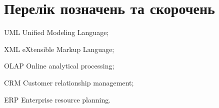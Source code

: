 \section*{Перелік позначень та скорочень}

\begin{abbrDescription}
\item[UML] Unified Modeling Language;
\item[XML] eXtensible Markup Language;
\item[OLAP] Online analytical processing;
\item[CRM] Customer relationship management;
\item[ERP] Enterprise resource planning.
\end{abbrDescription}
